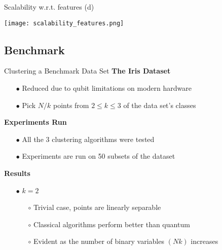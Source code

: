 \begin{frame}[allowframebreaks]{Scalability w.r.t. features (d)}
			\begin{center}
				\texttt{[image: scalability\_features.png]}
			\end{center}
		\end{frame}
	
	\subsection{Benchmark}
	\begin{frame}[allowframebreaks]{Clustering a Benchmark Data Set}
		\textbf{The Iris Dataset}
		\begin{itemize}
			\item[$\bullet$] Reduced due to qubit limitations on modern hardware
			\item[$\bullet$] Pick $N/k$ points from $2\leq k \leq3$ of the data set's classes
		\end{itemize}
	
		\textbf{Experiments Run}
		\begin{itemize}
			\item[$\bullet$] All the 3 clustering algorithms were tested
			\item[$\bullet$] Experiments are run on 50 subsets of the dataset
		\end{itemize}
	
		\textbf{Results}
		\begin{itemize}
			\item[$\bullet$] $k=2$
			\begin{itemize}
				\item[$\circ$] Trivial case, points are linearly separable
				\item[$\circ$] Classical algorithms perform better than quantum
				\item[$\circ$] Evident as the number of binary variables $(Nk)$ increases
			\end{itemize}
		

\end{itemize}
\end{frame}

